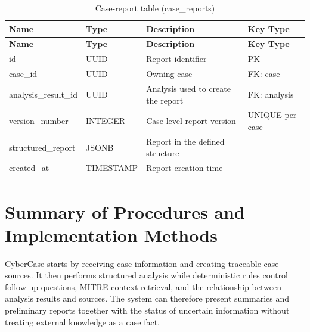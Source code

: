 \begin{longtable}{@{}>{\raggedright\arraybackslash}p{} >{\raggedright\arraybackslash}p{} >{\raggedright\arraybackslash}p{} >{\raggedright\arraybackslash}p{}@{}}
\caption{Case-report table (case\_reports)}\label{tab:3-16}\\
\toprule
\textbf{Name} & \textbf{Type} & \textbf{Description} & \textbf{Key Type} \\
\midrule
\endfirsthead
\textbf{Name} & \textbf{Type} & \textbf{Description} & \textbf{Key Type} \\
\midrule
\endhead
id & UUID & Report identifier & PK \\
case\_id & UUID & Owning case & FK: case \\
analysis\_result\_id & UUID & Analysis used to create the report & FK: analysis \\
version\_number & INTEGER & Case-level report version & UNIQUE per case \\
structured\_report & JSONB & Report in the defined structure &  \\
created\_at & TIMESTAMP & Report creation time &  \\
\bottomrule
\end{longtable}

\section{Summary of Procedures and Implementation Methods}

CyberCase starts by receiving case information and creating traceable case sources. It then performs structured analysis while deterministic rules control follow-up questions, MITRE context retrieval, and the relationship between analysis results and sources. The system can therefore present summaries and preliminary reports together with the status of uncertain information without treating external knowledge as a case fact.
